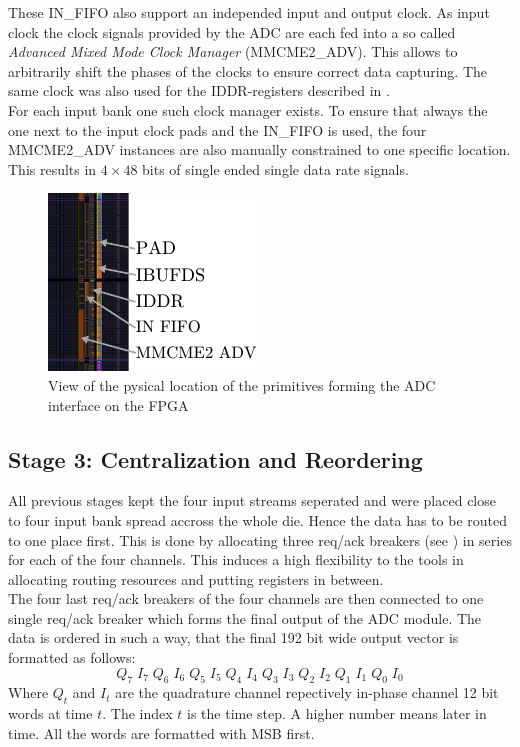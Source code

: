 These IN\_FIFO also support an independed input and output clock.
As input clock the clock signals provided by the \gls{ADC} are each fed
into a so called {\em Advanced Mixed Mode Clock Manager} (MMCME2\_ADV).
This allows to arbitrarily shift the phases of the clocks to ensure
correct data capturing. The same clock was also used for the
IDDR-registers described in . \\

For each input bank one such clock manager exists. To ensure that
always the one next to the input clock pads and the IN\_FIFO is
used, the four MMCME2\_ADV instances are also manually constrained to
one specific location. \\

This results in $4 \times 48$ bits of single ended single data rate signals. \\

\begin{figure}
  \centering
  \includegraphics{figures/adc_input_bank}
  \caption{View of the pysical location of the primitives forming the
    \gls{ADC} interface on the \gls{FPGA}}
  \label{fig:adc_input_bank}
\end{figure}

\subsection{Stage 3: Centralization and Reordering}
\label{sec:fpga_adc_s3}
All previous stages kept the four input streams seperated
and were placed close to four input bank spread accross the whole die.
Hence the data has to be routed to one place first.
This is done by allocating three req/ack breakers
(see ) in series for each of the four channels.
This induces a high flexibility to the tools in allocating routing resources
and putting registers in between. \\

The four last \gls{req}/\gls{ack} breakers of the four channels are then connected
to one single \gls{req}/\gls{ack} breaker which forms the final output of the
\gls{ADC} module. The data is ordered in such a way, that the final 192 bit
wide output vector is formatted as follows:
\[Q_7\;I_7\;Q_6\;I_6\;Q_5\;I_5\;Q_4\;I_4\;Q_3\;I_3\;Q_2\;I_2\;Q_1\;I_1\;Q_0\;I_0\]
Where $Q_t$ and $I_t$ are the quadrature channel repectively in-phase channel
12 bit words at time $t$.
The index $t$ is the time step. A higher number means later in time.
All the words are formatted with \gls{MSB} first. \\

